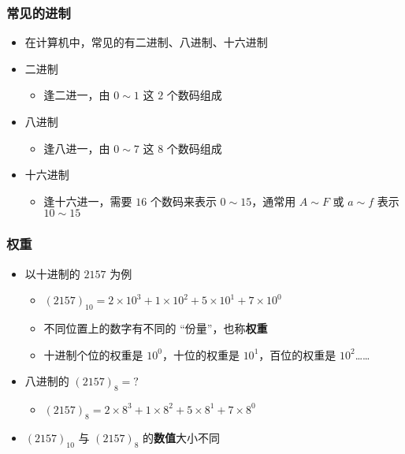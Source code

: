 \begin{frame}[fragile]
    \frametitle{常见的进制}

    \begin{itemize}
        \item 在计算机中，常见的有二进制、八进制、十六进制
        \item<2-> 二进制
        \begin{itemize}
           \item 逢二进一，由 $0 \sim 1$ 这 $2$ 个数码组成
        \end{itemize}
        \item<3-> 八进制
        \begin{itemize}
           \item 逢八进一，由 $0 \sim 7$ 这 $8$ 个数码组成
        \end{itemize}
        \item<4-> 十六进制
        \begin{itemize}
           \item 逢十六进一，需要 $16$ 个数码来表示 $0 \sim 15$，通常用 $A \sim F$ 或 $a \sim f$ 表示 $10 \sim 15$
        \end{itemize}
    \end{itemize}

\end{frame}

\begin{frame}[fragile]
    \frametitle{权重}

    \begin{itemize}[<+->]
        \item 以十进制的 $2157$ 为例
        \begin{itemize}
           \item $(2157)_{10} = 2 \times 10^3 + 1 \times 10^2 + 5 \times 10^1 + 7 \times 10^0$
           \item 不同位置上的数字有不同的 “份量”，也称\textbf{权重}
           \item 十进制个位的权重是 $10^0$，十位的权重是 $10^1$，百位的权重是 $10^2$……
        \end{itemize}
        \item 八进制的 $(2157)_8 = ?$
        \begin{itemize}
           \item $(2157)_{8} = 2 \times 8^3 + 1 \times 8^2 + 5 \times 8^1 + 7 \times 8^0$
        \end{itemize}
        \item $(2157)_{10}$ 与 $(2157)_{8}$ 的\textbf{数值}大小不同
    \end{itemize}

\end{frame}

